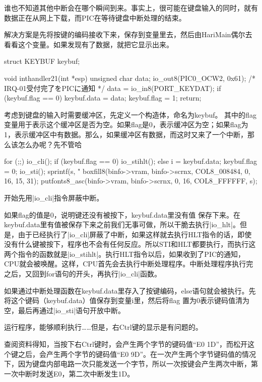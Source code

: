 谁也不知道其他中断会在哪个瞬间到来。事实上，很可能在键盘输入的同时，就有数据正在从网上下载，而PIC在等待键盘中断处理的结束。

\cs

解决方案是先将按键的编码接收下来，保存到变量里去，然后由HariMain偶尔去看看这个变量。如果发现有了数据，就把它显示出来。

\begin{code}
struct KEYBUF keybuf;

void inthandler21(int *esp)
{
	unsigned char data;
	io_out8(PIC0_OCW2, 0x61);	/* IRQ-01受付完了をPICに通知 */
	data = io_in8(PORT_KEYDAT);
	if (keybuf.flag == 0) {
		keybuf.data = data;
		keybuf.flag = 1;
	}
	return;
}
\end{code}

考虑到键盘的输入时需要缓冲区，先定义一个构造体，命名为keybuf。 其中的flag变量用于表示这个缓冲区是否为空。如果flag是0，表示缓冲区为空；如果flag为1，表示缓冲区中有数据。那么，如果缓冲区有数据，而这时又来了一个中断，那么该怎么办呢？先不管哈~

\cs

\begin{code}[label=bootpack.c中HariMain函数节选]
for (;;) {
		io_cli();
		if (keybuf.flag == 0) {
			io_stihlt();
		} else {
			i = keybuf.data;
			keybuf.flag = 0;
			io_sti();
			sprintf(s, "%
			boxfill8(binfo->vram, binfo->scrnx, COL8_008484, 0, 16, 15, 31);
			putfonts8_asc(binfo->vram, binfo->scrnx, 0, 16, COL8_FFFFFF, s);
		}
	}
\end{code}

开始先用|io_cli|指令屏蔽中断。

如果flag的值是0，说明键还没有被按下，keybuf.data里没有值 保存下来。在keybuf.data里有值被保存下来之前我们无事可做，所以干脆去执行|io_hlt|。但是，由于已经执行了|io_cli|屏蔽了中断，如果这样就去执行HLT指令的话，即使没有什么键被按下，程序也不会有任何反应。所以STI和HLT都要执行，而执行这两个指令的函数就是|io_stihlt|。执行HLT指令以后，如果收到了PIC的通知，CPU就会被唤醒。这样，CPU首先会去执行中断处理程序。中断处理程序执行完之后，又回到for语句的开头，再执行|io_cli|函数。

如果通过中断处理函数在keybuf.data里存入了按键编码，else语句就会被执行。先将这个键码（keybuf.data）值保存到变量i里，然后将flag 置为0表示键码值清为空，最后再通过|io_sti|语句开放中断。

\cs

运行程序，能够顺利执行……但是，右Ctrl键的显示是有问题的。

查阅资料得知，当按下右Ctrl键时，会产生两个字节的键码值“E0 1D”，而松开这个键之后，会产生两个字节的键码值“E0 9D”。在一次产生两个字节键码值的情况下，因为键盘内部电路一次只能发送一个字节，所以一次按键会产生两次中断，第一次中断时发送E0，第二次中断发生1D。

